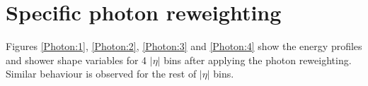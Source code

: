\section{Specific photon reweighting}
\label{Adx1:Photon}

Figures \ref{Photon:1}, \ref{Photon:2}, \ref{Photon:3} and \ref{Photon:4} show the energy profiles and shower shape variables for 4 $|\eta|$ bins after applying the photon reweighting. Similar behaviour is observed for the rest of $|\eta|$ bins.  
\begin{figure}[htbp]
    \centering
	 \\

\end{figure}
